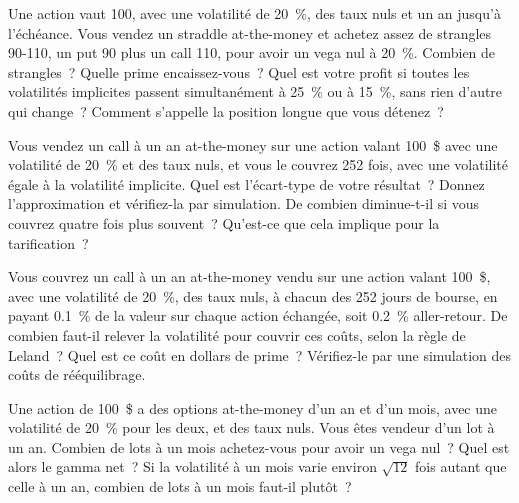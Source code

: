 \begin{question}\label{iq:iv2:options-parity-and-greeks:40}
Une action vaut 100, avec une volatilité de 20~\%, des taux nuls et un an jusqu'à l'échéance. Vous vendez un straddle at-the-money et achetez assez de strangles 90-110, un put 90 plus un call 110, pour avoir un vega nul à 20~\%. Combien de strangles~? Quelle prime encaissez-vous~? Quel est votre profit si toutes les volatilités implicites passent simultanément à 25~\% ou à 15~\%, sans rien d'autre qui change~? Comment s'appelle la position longue que vous détenez~?
\end{question}

\begin{question}\label{iq:iv2:options-parity-and-greeks:41}
Vous vendez un call à un an at-the-money sur une action valant 100~\$ avec une volatilité de 20~\% et des taux nuls, et vous le couvrez 252 fois, avec une volatilité égale à la volatilité implicite. Quel est l'écart-type de votre résultat~? Donnez l'approximation et vérifiez-la par simulation. De combien diminue-t-il si vous couvrez quatre fois plus souvent~? Qu'est-ce que cela implique pour la tarification~?
\end{question}

\begin{question}\label{iq:iv2:options-parity-and-greeks:42}
Vous couvrez un call à un an at-the-money vendu sur une action valant 100~\$, avec une volatilité de 20~\%, des taux nuls, à chacun des 252 jours de bourse, en payant 0.1~\% de la valeur sur chaque action échangée, soit 0.2~\% aller-retour. De combien faut-il relever la volatilité pour couvrir ces coûts, selon la règle de Leland~? Quel est ce coût en dollars de prime~? Vérifiez-le par une simulation des coûts de rééquilibrage.
\end{question}

\begin{question}\label{iq:iv2:options-parity-and-greeks:43}
Une action de 100~\$ a des options at-the-money d'un an et d'un mois, avec une volatilité de 20~\% pour les deux, et des taux nuls. Vous êtes vendeur d'un lot à un an. Combien de lots à un mois achetez-vous pour avoir un vega nul~? Quel est alors le gamma net~? Si la volatilité à un mois varie environ $\sqrt{12}$ fois autant que celle à un an, combien de lots à un mois faut-il plutôt~?
\end{question}

